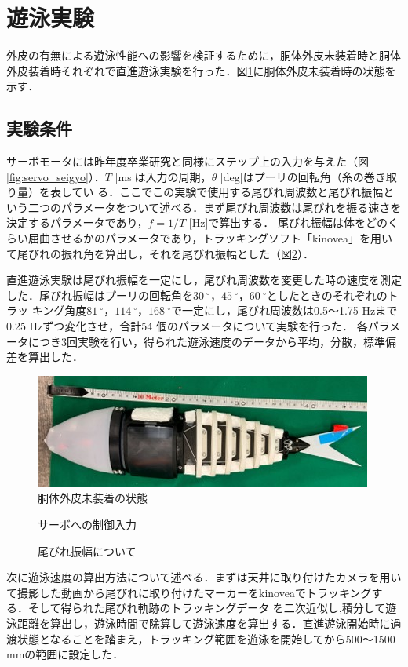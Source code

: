 \newpage
\section{遊泳実験}
外皮の有無による遊泳性能への影響を検証するために，胴体外皮未装着時と胴体外皮装着時それぞれで直進遊泳実験を行った．図\ref{fig:doutainasi}に胴体外皮未装着時の状態を示す．

\subsection{実験条件}
サーボモータには昨年度卒業研究と同様にステップ上の入力を与えた（図\ref{fig:servo_seigyo}）．$T$ [ms]は入力の周期，$\theta$ [deg]はプーリの回転角（糸の巻き取り量）を表してい
る．ここでこの実験で使用する尾びれ周波数と尾びれ振幅という二つのパラメータをついて述べる．まず尾びれ周波数は尾びれを振る速さを決定するパラメータであり，$f = 1/T$ [Hz]で算出する．
尾びれ振幅は体をどのくらい屈曲させるかのパラメータであり，トラッキングソフト「kinovea」を用いて尾びれの振れ角を算出し，それを尾びれ振幅とした（図\ref{fig:obire_amp}）． 

直進遊泳実験は尾びれ振幅を一定にし，尾びれ周波数を変更した時の速度を測定した．尾びれ振幅はプーリの回転角を$30\:^\circ$，$45\:^\circ$，$60\:^\circ$としたときのそれぞれのトラッ
キング角度$81\:^\circ$，$114\:^\circ$，$168\:^\circ$で一定にし，尾びれ周波数は0.5～1.75 Hzまで0.25 Hzずつ変化させ，合計54 個のパラメータについて実験を行った．
各パラメータにつき3回実験を行い，得られた遊泳速度のデータから平均，分散，標準偏差を算出した．
\begin{figure}[htbp]
    \centering
    \includegraphics[width=0.8\linewidth]{chapters/picture/without_skin.jpg}
    \caption{胴体外皮未装着の状態}
    \label{fig:doutainasi}
\end{figure}
\begin{figure}[htbp]
    \centering
     \begin{minipage}[b]{0.5\linewidth}
        \centering
        \caption{サーボへの制御入力}
        \label{fig:servo_seigyo}
     \end{minipage}
     \hspace{0.05\linewidth}
     \begin{minipage}[b]{0.4\linewidth}
        \centering
        \caption{尾びれ振幅について}
        \label{fig:obire_amp}
     \end{minipage}
\end{figure}
次に遊泳速度の算出方法について述べる．まずは天井に取り付けたカメラを用いて撮影した動画から尾びれに取り付けたマーカーをkinoveaでトラッキングする．そして得られた尾びれ軌跡のトラッキングデータ
を二次近似し,積分して遊泳距離を算出し，遊泳時間で除算して遊泳速度を算出する．直進遊泳開始時に過渡状態となることを踏まえ，トラッキング範囲を遊泳を開始してから500～1500 mmの範囲に設定した．

